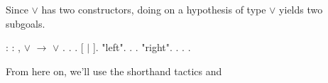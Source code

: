 \documentclass[12pt]{report}
\begin{document}
 Since  \ensuremath{\lor}  has two constructors, doing  on a
    hypothesis of type  \ensuremath{\lor}  yields two subgoals. \begin{coqdoccode}
\coqdocemptyline
\coqdocnoindent
{}  : \coqdockw{\ensuremath{\forall}}   : ,\coqdoceol
\coqdocindent{1.00em}
 \ensuremath{\lor}   \ensuremath{\rightarrow}  \ensuremath{\lor} .\coqdoceol
\coqdocnoindent
{}.\coqdoceol
\coqdocindent{1.00em}
   .\coqdoceol
\coqdocindent{1.00em}
   [ \ensuremath{|} ].\coqdoceol
\coqdocindent{2.00em}
 "left".  .  .\coqdoceol
\coqdocindent{2.00em}
 "right".  .  . .\coqdoceol
\coqdocemptyline
\end{coqdoccode}
From here on, we'll use the shorthand tactics  and 
\end{document}

